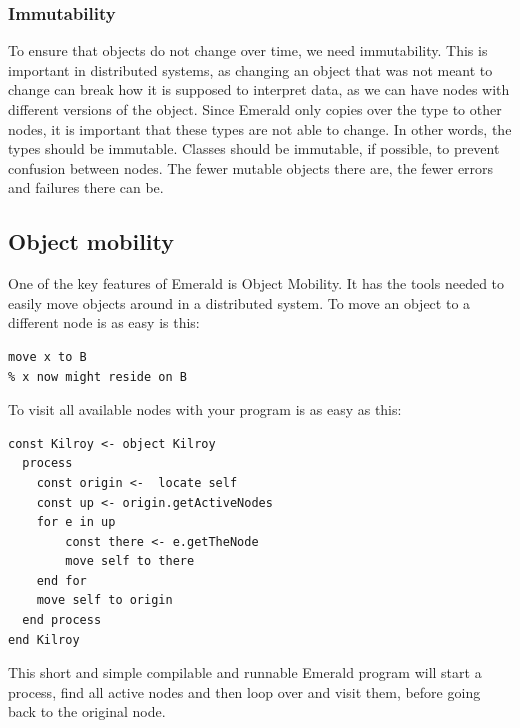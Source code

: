 \subsubsection{Immutability}
To ensure that objects do not change over time, we need immutability. This is important in distributed systems, as changing an object that was not meant to change can break how it is supposed to interpret data, as we can have nodes with different versions of the object. Since Emerald only copies over the type to other nodes, it is important that these types are not able to change. In other words, the types should be immutable.  Classes should be immutable, if possible, to prevent confusion between nodes. The fewer mutable objects there are, the fewer errors and failures there can be.

\subsection{Object mobility}
One of the key features of Emerald is Object Mobility. It has the tools needed to easily move objects around in a distributed system. To move an object to a different node is as easy is this:
\begin{lstlisting}[language=emerald]
% x is created and resides on A
move x to B
% x now might reside on B
\end{lstlisting}
To visit all available nodes with your program is as easy as this\cite{noauthor_emerald_nodate}:
\begin{lstlisting}[language=emerald]
const Kilroy <- object Kilroy
  process
    const origin <-  locate self
    const up <- origin.getActiveNodes
    for e in up
      	const there <- e.getTheNode
      	move self to there
    end for
    move self to origin
  end process
end Kilroy
\end{lstlisting}
This short and simple compilable and runnable Emerald program will start a process, find all active nodes and then loop over and visit them, before going back to the original node.


